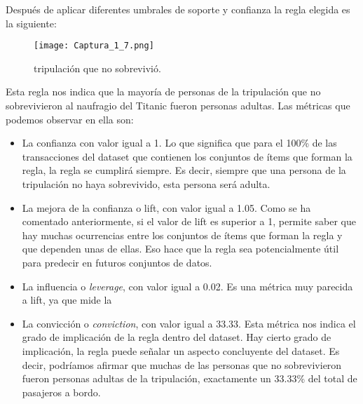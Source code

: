 \documentclass[11pt]{exam}
\begin{document}
\begin{questions}
Después de aplicar diferentes umbrales de soporte y confianza la regla elegida es la siguiente:

\begin{figure}[h]
	\centering
	\texttt{[image: Captura\_1\_7.png]}
	\caption{tripulación que no sobrevivió.}
	\label{Captura_1_7}
\end{figure}

Esta regla nos indica que la mayoría de personas de la tripulación que no sobrevivieron al naufragio del Titanic fueron personas adultas. Las métricas que podemos observar en ella son:

\begin{itemize}
	\item La confianza con valor igual a 1. Lo que significa que para el 100\% de las transacciones del dataset que contienen los conjuntos de ítems que forman la regla, la regla se cumplirá siempre. Es decir, siempre que una persona de la tripulación no haya sobrevivido, esta persona será adulta.
	\item La mejora de la confianza o lift, con valor igual a 1.05. Como se ha comentado anteriormente, si el valor de lift es superior a 1, permite saber que hay muchas ocurrencias entre los conjuntos de ítems que forman la regla y que dependen unas de ellas. Eso hace que la regla sea potencialmente útil para predecir en futuros conjuntos de datos.
	\item La influencia o \textit{leverage}, con valor igual a 0.02. Es una métrica muy parecida a lift, ya que mide la 
	\item La convicción o \textit{conviction}, con valor igual a 33.33. Esta métrica nos indica el grado de implicación de la regla dentro del dataset. Hay cierto grado de implicación, la regla puede señalar un aspecto concluyente del dataset. Es decir, podríamos afirmar que muchas de las personas que no sobrevivieron fueron personas adultas de la tripulación, exactamente un 33.33\% del total de pasajeros a bordo.
\end{itemize}

\end{questions}
\end{document}
